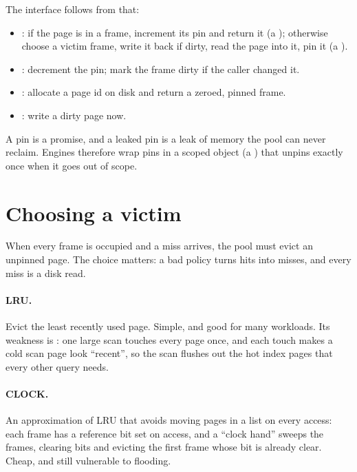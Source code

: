 The interface follows from that:

\begin{itemize}
\item {}: if the page is in a frame, increment its pin and return it (a ); otherwise choose a victim frame, write it back if dirty, read the page into it, pin it (a ).
\item {}: decrement the pin; mark the frame dirty if the caller changed it.
\item {}: allocate a page id on disk and return a zeroed, pinned frame.
\item {}: write a dirty page now.
\end{itemize}

\begin{keyidea}
A pin is a promise, and a leaked pin is a leak of memory the pool can never
reclaim. Engines therefore wrap pins in a scoped object (a )
that unpins exactly once when it goes out of scope.
\end{keyidea}

\section{Choosing a victim}

When every frame is occupied and a miss arrives, the pool must evict an
unpinned page. The choice matters: a bad policy turns hits into misses, and
every miss is a disk read.

\paragraph{LRU.} Evict the least recently used page. Simple, and good for many
workloads. Its weakness is : one large scan touches
every page once, and each touch makes a cold scan page look ``recent'', so the
scan flushes out the hot index pages that every other query needs.

\paragraph{CLOCK.} An approximation of LRU that avoids moving pages in a list on
every access: each frame has a reference bit set on access, and a ``clock hand''
sweeps the frames, clearing bits and evicting the first frame whose bit is
already clear. Cheap, and still vulnerable to flooding.

